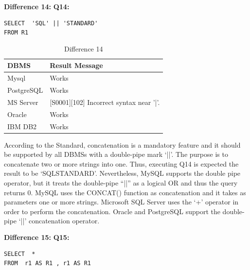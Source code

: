 \hfill\newpage
\hfill\newline\textbf{Difference 14:}
\hfill\newline\textbf{Q14:}

\begin{mdframed}[backgroundcolor=lightgray!20]
\begin{lstlisting}[style=SQL]
SELECT  'SQL' || 'STANDARD'
FROM R1
\end{lstlisting}
\end{mdframed}
 
\begin{table}[h]
\centering
\caption{Difference 14}
\label{my-label}
\begin{tabular}{|p{2cm}|p{11.5cm}| }
\hline
\textbf{DBMS} & \textbf{Result Message}                         \\ \hline
Mysql         & Works                                           \\ \hline
PostgreSQL    & Works                                           \\ \hline
MS Server     & {[}S0001{]}{[}102{]} Incorrect syntax near '|'. \\ \hline
Oracle        & Works                                           \\ \hline
IBM DB2       & Works                                           \\ \hline
\end{tabular}
\end{table}

According to the Standard, concatenation is a mandatory feature and it should be supported by all DBMSs with a double-pipe mark ‘||’. The purpose is to concatenate two or more strings into one. Thus, executing Q14 is expected the result to be ‘SQLSTANDARD’. Nevertheless, MySQL supports the double pipe operator, but it treats the double-pipe “||” as a logical OR and thus the query returns 0. MySQL uses the CONCAT() function as concatenation and it takes as parameters one or more strings.   Microsoft SQL Server uses the ‘+’ operator in order to perform the concatenation. Oracle and PostgreSQL support the double-pipe ‘||’ concatenation operator. 




\hfill\newline\textbf{Difference 15:}
\hfill\newline\textbf{Q15:}

\begin{mdframed}[backgroundcolor=lightgray!20]
\begin{lstlisting}[style=SQL]
SELECT  *
FROM  r1 AS R1 , r1 AS R1
\end{lstlisting}
\end{mdframed}

